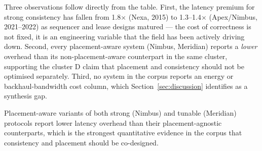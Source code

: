 Three observations follow directly from the table. First, the latency premium for strong consistency
has fallen from 1.8$\times$ (Nexa, 2015) to 1.3--1.4$\times$ (Apex/Nimbus, 2021--2022) as sequencer and
lease designs matured --- the cost of correctness is not fixed, it is an engineering variable that the
field has been actively driving down. Second, every placement-aware system (Nimbus, Meridian) reports a
\emph{lower} overhead than its non-placement-aware counterpart in the same cluster, supporting the
cluster D claim that placement and consistency should not be optimised separately. Third, no system in
the corpus reports an energy or backhaul-bandwidth cost column, which Section~\ref{sec:discussion}
identifies as a synthesis gap.

\begin{keytakeaway}
Placement-aware variants of both strong (Nimbus) and tunable (Meridian) protocols report lower latency
overhead than their placement-agnostic counterparts, which is the strongest quantitative evidence in
the corpus that consistency and placement should be co-designed.
\end{keytakeaway}
